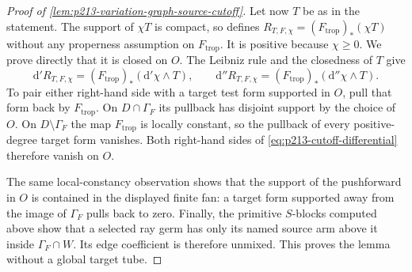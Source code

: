 \begin{proof}[Proof of
\cref{lem:p213-variation-graph-source-cutoff}]
Let now $T$ be as in the statement.  The support of $\chi T$ is compact,
so \cite[\S7.1.11]{CLD25} defines
$R_{T,F,\chi}=(F_{\mathrm{trop}})_*(\chi T)$ without any properness
assumption on $F_{\mathrm{trop}}$.  It is positive because $\chi\geq0$.
We prove directly that it is closed on $O$.  The Leibniz rule and the
closedness of $T$ give
\begin{equation}
 \mathrm d'R_{T,F,\chi}
     =(F_{\mathrm{trop}})_*(\mathrm d'\chi\wedge T),
 \qquad
 \mathrm d''R_{T,F,\chi}
     =(F_{\mathrm{trop}})_*(\mathrm d''\chi\wedge T).
\label{eq:p213-cutoff-differential}
\end{equation}
To pair either right-hand side with a target test form supported in $O$,
pull that form back by $F_{\mathrm{trop}}$.  On
$D\cap\Gamma_F$ its pullback has disjoint support by the choice of $O$.
On $D\setminus\Gamma_F$ the map $F_{\mathrm{trop}}$ is locally constant,
so the pullback of every positive-degree target form vanishes.  Both
right-hand sides of \eqref{eq:p213-cutoff-differential} therefore vanish
on $O$.

The same local-constancy observation shows that the support of the
pushforward in $O$ is contained in the displayed finite fan: a target
form supported away from the image of $\Gamma_F$ pulls back to zero.
Finally, the primitive $S$-blocks computed above show that a selected ray
germ has only its named source arm above it inside
$\Gamma_F\cap W$.  Its edge coefficient is therefore unmixed.  This
proves the lemma without a global target tube.
\end{proof}

